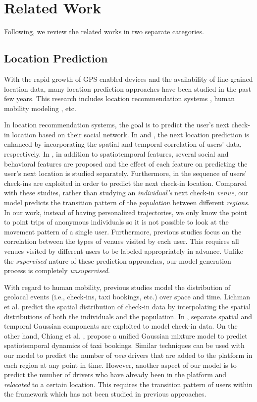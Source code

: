 \section{Related Work}
\label{sec:related}

Following, we review the related works in two separate categories.

\subsection{Location Prediction}

With the rapid growth of GPS enabled devices and the availability of fine-grained location data, many location prediction approaches have been studied in the past few years. This research includes location recommendation systems \cite{Noulas12,Yin13,Yuan13,Zhang14,Wang16}, human mobility modeling \cite{Cho11,Lichman14,Chiang15}, etc.

In location recommendation systems, the goal is to predict the user's next check-in location based on their social network. In \cite{Yin13} and \cite{Yuan13}, the next location prediction is enhanced by incorporating the spatial and temporal correlation of users' data, respectively. In \cite{Noulas12}, in addition to spatiotemporal features, several social and behavioral features are proposed and the effect of each feature on predicting the user's next location is studied separately. Furthermore, in \cite{Zhang14,Wang16} the sequence of users' check-ins are exploited in order to predict the next check-in location. Compared with these studies, rather than studying an \emph{individual's} next check-in \emph{venue}, our model predicts the transition pattern of the \emph{population} between different \emph{regions}. In our work, instead of having personalized trajectories, we only know the point to point trips of anonymous individuals so it is not possible to look at the movement pattern of a single user. Furthermore, previous studies focus on the correlation between the types of venues visited by each user. This requires all venues visited by different users to be labeled appropriately in advance. Unlike the \textit{supervised} nature of these prediction approaches, our model generation process is completely \textit{unsupervised}.

With regard to human mobility, previous studies model the distribution of geolocal events (i.e., check-ins, taxi bookings, etc.) over space and time. Lichman et al. \cite{Lichman14} predict the spatial distribution of check-in data by interpolating the spatial distributions of both the individuals and the population. In \cite{Cho11}, separate spatial and temporal Gaussian components are exploited to model check-in data. On the other hand, Chiang et al. \cite{Chiang15}, propose a unified Gaussian mixture model to predict spatiotemporal dynamics of taxi bookings. Similar techniques can be used with our model to predict the number of \emph{new} drivers that are added to the platform in each region at any point in time. However, another aspect of our model is to predict the number of drivers who have already been in the platform and \emph{relocated} to a certain location. This requires the transition pattern of users within the framework which has not been studied in previous approaches.


